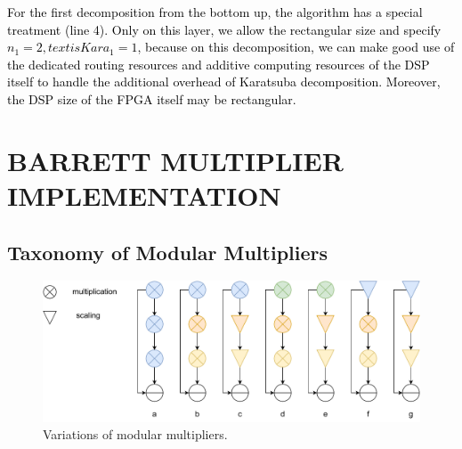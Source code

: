 \documentclass[conference]{IEEEtran}
\begin{document}
\textcolor{black}{
For the first decomposition from the bottom up, the algorithm has a special treatment (line 4). Only on this layer, we allow the rectangular size and specify $n_1 = 2, text{isKara}_1 = 1$, because on this decomposition, we can make good use of the dedicated routing resources and additive computing resources of the DSP itself to handle the additional overhead of Karatsuba decomposition. Moreover, the DSP size of the FPGA itself may be rectangular.
}


\section{BARRETT MULTIPLIER IMPLEMENTATION}

\subsection{Taxonomy of Modular Multipliers}

\begin{figure}[htbp]   %
	\centering
	\includegraphics[width=\linewidth,scale=1.00]{fig9.pdf}    %
	\caption{Variations of modular multipliers.}
	\label{Figure9}
\end{figure}
\end{document}
